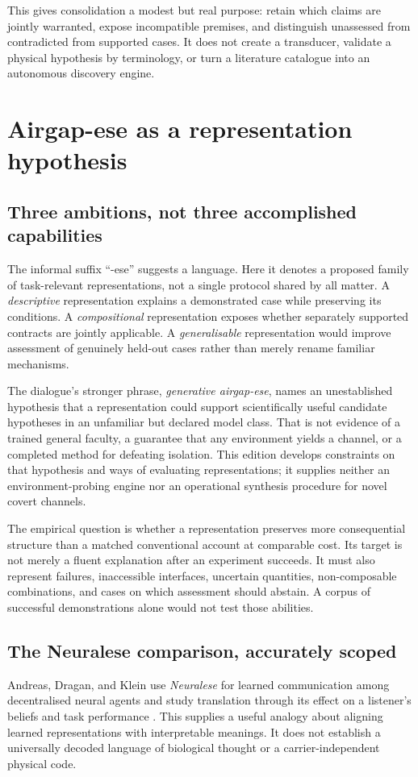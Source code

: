 \documentclass[11pt,a4paper]{article}
\theoremstyle{definition}
\theoremstyle{remark}
\begin{document}
This gives consolidation a modest but real purpose: retain which claims are jointly warranted, expose incompatible premises, and distinguish unassessed from contradicted from supported cases. It does not create a transducer, validate a physical hypothesis by terminology, or turn a literature catalogue into an autonomous discovery engine.


\section{Airgap-ese as a representation hypothesis}\label{sec:representation}
\subsection{Three ambitions, not three accomplished capabilities}
The informal suffix ``-ese'' suggests a language. Here it denotes a proposed family of task-relevant representations, not a single protocol shared by all matter. A \emph{descriptive} representation explains a demonstrated case while preserving its conditions. A \emph{compositional} representation exposes whether separately supported contracts are jointly applicable. A \emph{generalisable} representation would improve assessment of genuinely held-out cases rather than merely rename familiar mechanisms.

The dialogue's stronger phrase, \emph{generative airgap-ese}, names an unestablished hypothesis that a representation could support scientifically useful candidate hypotheses in an unfamiliar but declared model class. That is not evidence of a trained general faculty, a guarantee that any environment yields a channel, or a completed method for defeating isolation. This edition develops constraints on that hypothesis and ways of evaluating representations; it supplies neither an environment-probing engine nor an operational synthesis procedure for novel covert channels.

The empirical question is whether a representation preserves more consequential structure than a matched conventional account at comparable cost. Its target is not merely a fluent explanation after an experiment succeeds. It must also represent failures, inaccessible interfaces, uncertain quantities, non-composable combinations, and cases on which assessment should abstain. A corpus of successful demonstrations alone would not test those abilities.

\subsection{The Neuralese comparison, accurately scoped}
Andreas, Dragan, and Klein use \emph{Neuralese} for learned communication among decentralised neural agents and study translation through its effect on a listener's beliefs and task performance \citep{neuralese}. This supplies a useful analogy about aligning learned representations with interpretable meanings. It does not establish a universally decoded language of biological thought or a carrier-independent physical code.
\end{document}
